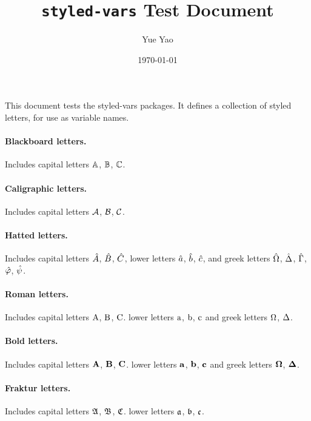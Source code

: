 \documentclass[10pt]{article}
\title{\texttt{styled-vars} Test Document}%
\author{Yue Yao}
\date{\today}
\begin{document}
\maketitle{}

This document tests the styled-vars packages. It defines a collection of styled letters, for
use as variable names.

\paragraph{Blackboard letters.} Includes capital letters $\mathbb{A}$, $\mathbb{B}$, $\mathbb{C}$.

\paragraph{Caligraphic letters.} Includes capital letters $\mathcal{A}$, $\mathcal{B}$, $\mathcal{C}$.

\paragraph{Hatted letters.} Includes capital letters $\hat{A}$, $\hat{B}$, $\hat{C}$, 
lower letters $\hat{a}$, $\hat{b}$, $\hat{c}$, and
greek letters $\hat{\Omega}$, $\hat{\Delta}$, $\hat{\Gamma}$, $\hat{\varphi}$, $\hat{\psi}$.

\paragraph{Roman letters.} Includes capital letters $\mathrm{A}$, $\mathrm{B}$, $\mathrm{C}$.
lower letters $\mathrm{a}$, $\mathrm{b}$, $\mathrm{c}$ and 
greek letters $\mathrm{\Omega}$, $\mathrm{\Delta}$.

\paragraph{Bold letters.} Includes capital letters $\mathbf{A}$, $\mathbf{B}$, $\mathbf{C}$.
lower letters $\mathbf{a}$, $\mathbf{b}$, $\mathbf{c}$ and 
greek letters $\mathbf{\Omega}$, $\mathbf{\Delta}$.

\paragraph{Fraktur letters.} Includes capital letters $\mathfrak{A}$, $\mathfrak{B}$, $\mathfrak{C}$.
lower letters $\mathfrak{a}$, $\mathfrak{b}$, $\mathfrak{c}$.
\end{document}
